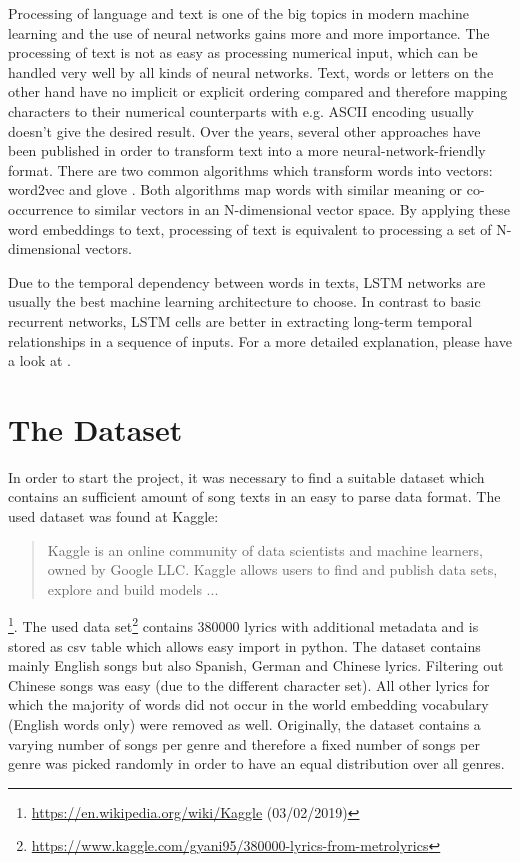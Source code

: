 \documentclass[12pt]{article}
\begin{document}
Processing of language and text is one of the big topics in modern machine learning and the use of neural networks gains more and more importance. The processing of text is not as easy as processing numerical input, which can be handled very well by all kinds of neural networks. Text, words or letters on the other hand have no implicit or explicit ordering compared and therefore mapping characters to their numerical counterparts with e.g. ASCII encoding usually doesn't give the desired result.
Over the years, several other approaches have been published in order to transform text into a more neural-network-friendly format. There are two common algorithms which transform words into vectors: word2vec \cite{goldberg2014word2vec} and glove \cite{pennington2014glove}. Both algorithms map words with similar meaning or co-occurrence to similar vectors in an N-dimensional vector space. By applying these word embeddings to text, processing of text is equivalent to processing a set of N-dimensional vectors.

Due to the temporal dependency between words in texts, LSTM\cite{gers1999learning} networks are usually the best machine learning architecture to choose. In contrast to basic recurrent networks, LSTM cells are better in extracting long-term temporal relationships in a sequence of inputs. For a more detailed explanation, please have a look at \cite{gers1999learning}.

\section{The Dataset}\label{sec:dataset}

In order to start the project, it was necessary to find a suitable dataset which contains an sufficient amount of song texts in an easy to parse data format. The used dataset was found at Kaggle: \blockquote{Kaggle is an online community of data scientists and machine learners, owned by Google LLC. Kaggle allows users to find and publish data sets, explore and build models ... 
}\footnote{\url{https://en.wikipedia.org/wiki/Kaggle} (03/02/2019)}. The used data set\footnote{\url{https://www.kaggle.com/gyani95/380000-lyrics-from-metrolyrics}} contains 380000 lyrics with additional metadata and is stored as csv table which allows easy import in python. The dataset contains mainly English songs but also Spanish, German and Chinese lyrics. Filtering out Chinese songs was easy (due to the different character set). All other lyrics for which the majority of words did not occur in the world embedding vocabulary (English words only) were removed as well. Originally, the dataset contains a varying number of songs per genre and therefore a fixed number of songs per genre was picked randomly in order to have an equal distribution over all genres.
\end{document}
